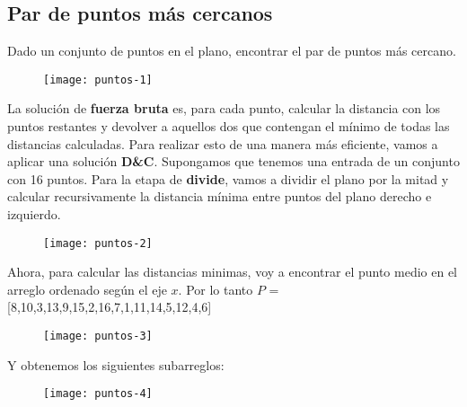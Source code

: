 \documentclass[10pt,a4paper]{article}
\begin{document}
\subsection{Par de puntos más cercanos}

Dado un conjunto de puntos en el plano, encontrar el par de puntos más cercano.
\newline
\newline
\begin{figure}[h]
	\centering
\texttt{[image: puntos-1]}
	\label{drivers1}
\end{figure}
\newline
\newline
La solución de \textbf{fuerza bruta} es, para cada punto, calcular la distancia con los puntos restantes y devolver a aquellos dos que contengan el mínimo de todas las distancias calculadas.
\newpage
Para realizar esto de una manera más eficiente, vamos a aplicar una solución \textbf{D\&C}. 
\newline
\newline
Supongamos que tenemos una entrada de un conjunto con 16 puntos.
\newline
\newline
Para la etapa de \textbf{divide}, vamos a dividir el plano por la mitad y calcular recursivamente la distancia mínima entre puntos del plano derecho e izquierdo. 
\newline
\newline
\begin{figure}[h]
	\centering
\texttt{[image: puntos-2]}
	\label{drivers1}
\end{figure}
\newline
\newline
Ahora, para calcular las distancias minimas, voy a encontrar el punto medio en el arreglo ordenado según el eje $x$. 
\newline
\newline
Por lo tanto $P$ = [8,10,3,13,9,15,2,16,7,1,11,14,5,12,4,6]
\newline
\newline
\begin{figure}[h]
	\centering
\texttt{[image: puntos-3]}
	\label{drivers1}
\end{figure}
\newpage
Y obtenemos los siguientes subarreglos:
\newline
\newline
\begin{figure}[h]
	\centering
\texttt{[image: puntos-4]}
	\label{drivers1}
\end{figure}
\end{document}
